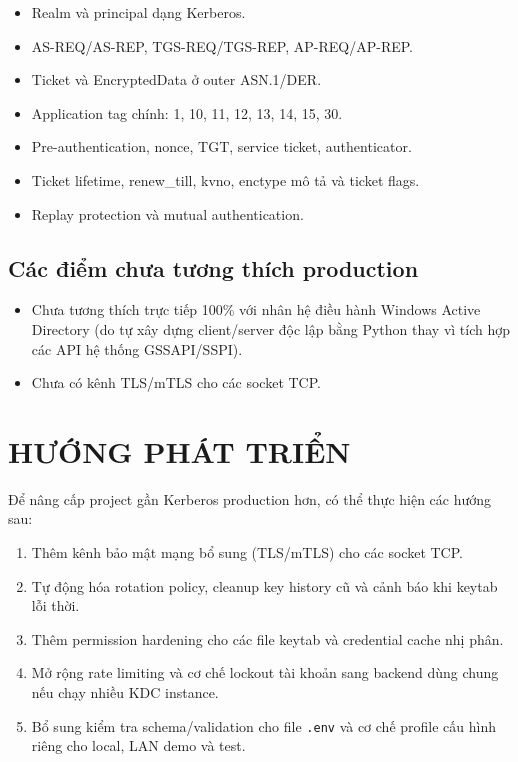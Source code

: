 \documentclass[12pt]{article}
\begin{document}
\begin{itemize}
    \item Realm và principal dạng Kerberos.
    \item AS-REQ/AS-REP, TGS-REQ/TGS-REP, AP-REQ/AP-REP.
    \item Ticket và EncryptedData ở outer ASN.1/DER.
    \item Application tag chính: 1, 10, 11, 12, 13, 14, 15, 30.
    \item Pre-authentication, nonce, TGT, service ticket, authenticator.
    \item Ticket lifetime, renew\_till, kvno, enctype mô tả và ticket flags.
    \item Replay protection và mutual authentication.
\end{itemize}

\subsection{Các điểm chưa tương thích production}

\begin{itemize}
    \item Chưa tương thích trực tiếp 100\% với nhân hệ điều hành Windows Active Directory (do tự xây dựng client/server độc lập bằng Python thay vì tích hợp các API hệ thống GSSAPI/SSPI).
    \item Chưa có kênh TLS/mTLS cho các socket TCP.
\end{itemize}

\section{HƯỚNG PHÁT TRIỂN}

Để nâng cấp project gần Kerberos production hơn, có thể thực hiện các hướng sau:
\begin{enumerate}
    \item Thêm kênh bảo mật mạng bổ sung (TLS/mTLS) cho các socket TCP.
    \item Tự động hóa rotation policy, cleanup key history cũ và cảnh báo khi keytab lỗi thời.
    \item Thêm permission hardening cho các file keytab và credential cache nhị phân.
    \item Mở rộng rate limiting và cơ chế lockout tài khoản sang backend dùng chung nếu chạy nhiều KDC instance.
    \item Bổ sung kiểm tra schema/validation cho file \texttt{.env} và cơ chế profile cấu hình riêng cho local, LAN demo và test.
\end{enumerate}
\end{document}
